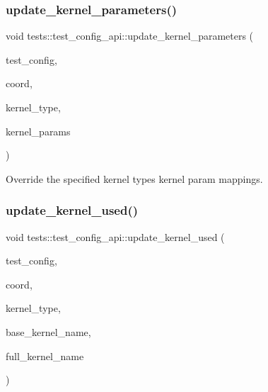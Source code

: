 \subsubsection{\texorpdfstring{update\+\_\+kernel\+\_\+parameters()}{update\_kernel\_parameters()}\hspace{0.1cm}{\footnotesize\ttfamily [3/3]}}
{\footnotesize\ttfamily void tests\+::test\+\_\+config\+\_\+api\+::update\+\_\+kernel\+\_\+parameters (\begin{DoxyParamCaption}\item[{\hyperlink{structtests_1_1TestConfig}{Test\+Config} \&}]{test\+\_\+config,  }\item[{\hyperlink{structllk_1_1xy__pair}{llk\+::xy\+\_\+pair}}]{coord,  }\item[{\hyperlink{namespacetests_a4f360b8af533762256ff97513bfd6a0d}{tests\+::\+Kernel\+Type}}]{kernel\+\_\+type,  }\item[{\hyperlink{structtests_1_1KernelParams}{tests\+::\+Kernel\+Params}}]{kernel\+\_\+params }\end{DoxyParamCaption})}



Override the specified kernel type\textquotesingle{}s kernel param mappings. 

\mbox{\label{namespacetests_1_1test__config__api_af3c341ace6617f546990ef3f49e55a24}} 
\subsubsection{\texorpdfstring{update\+\_\+kernel\+\_\+used()}{update\_kernel\_used()}}
{\footnotesize\ttfamily void tests\+::test\+\_\+config\+\_\+api\+::update\+\_\+kernel\+\_\+used (\begin{DoxyParamCaption}\item[{\hyperlink{structtests_1_1TestConfig}{Test\+Config} \&}]{test\+\_\+config,  }\item[{\hyperlink{structllk_1_1xy__pair}{llk\+::xy\+\_\+pair}}]{coord,  }\item[{\hyperlink{namespacetests_a4f360b8af533762256ff97513bfd6a0d}{tests\+::\+Kernel\+Type}}]{kernel\+\_\+type,  }\item[{string}]{base\+\_\+kernel\+\_\+name,  }\item[{string}]{full\+\_\+kernel\+\_\+name }\end{DoxyParamCaption})}



